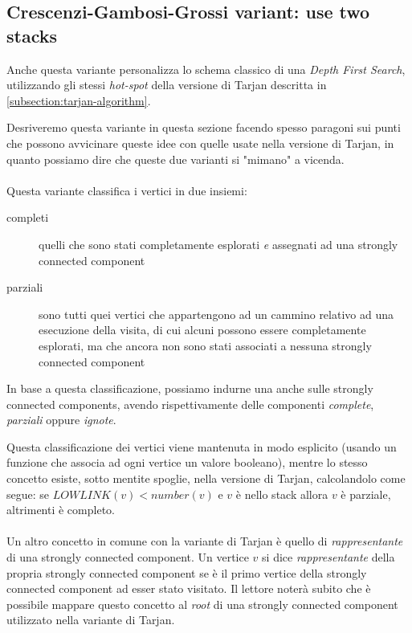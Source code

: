 \subsection{Crescenzi-Gambosi-Grossi variant: use two stacks}
\label{subsection:crescenzi-gambosi-grossi}
Anche questa variante personalizza lo schema classico di una
\emph{Depth First Search}, utilizzando gli stessi \emph{hot-spot}
della versione di Tarjan descritta in
\ref{subsection:tarjan-algorithm}. 

Desriveremo questa variante in questa sezione facendo spesso paragoni
sui punti che possono avvicinare queste idee con quelle usate nella
versione di Tarjan, in quanto possiamo dire che queste due varianti si
"mimano" a vicenda.
\\\\
Questa variante classifica i vertici in due insiemi:
\begin{description}
\item[completi] quelli che sono stati completamente esplorati \emph{e}
  assegnati ad una strongly connected component
\item[parziali] sono tutti quei vertici che appartengono ad un cammino
  relativo ad una esecuzione della visita, di cui alcuni possono
  essere completamente esplorati, ma che ancora non sono stati
  associati a nessuna strongly connected component
\end{description}
In base a questa classificazione, possiamo indurne una anche sulle
strongly connected components, avendo rispettivamente delle componenti
\emph{complete}, \emph{parziali} oppure \emph{ignote}.

Questa classificazione dei vertici viene mantenuta in modo esplicito
(usando un funzione che associa ad ogni vertice un valore booleano),
mentre lo stesso concetto esiste, sotto mentite spoglie, nella
versione di Tarjan, calcolandolo come segue: se $LOWLINK(v) <
number(v)$ e $v$ \`e nello stack allora $v$ \`e parziale, altrimenti
\`e completo.
\\\\
Un altro concetto in comune con la variante di Tarjan \`e quello di
\emph{rappresentante} di una strongly connected component. Un vertice
$v$ si dice \emph{rappresentante} della propria strongly connected
component se \`e il primo vertice della strongly connected component
ad esser stato visitato. Il lettore noter\`a subito che \`e possibile
mappare questo concetto al \emph{root} di una strongly connected
component utilizzato nella variante di Tarjan.

